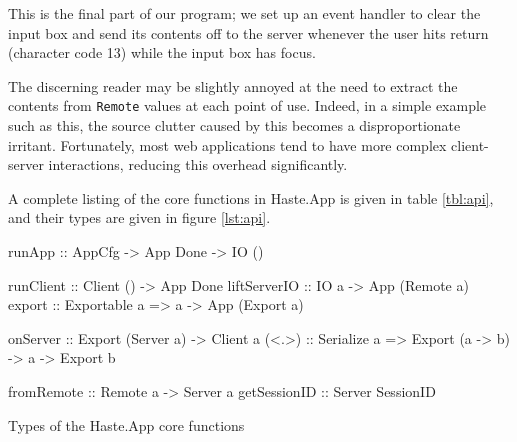 \documentclass[preprint]{sigplanconf}
\begin{document}

This is the final part of our program; we set up an event handler to clear the
input box and send its contents off to the server whenever the user hits return
(character code 13) while the input box has focus.

The discerning reader may be slightly annoyed at the need to extract the
contents from \lstinline!Remote! values at each point of use. Indeed, in a
simple example such as this, the source clutter caused by this becomes a
disproportionate irritant. Fortunately, most web applications tend to have
more complex client-server interactions, reducing this overhead significantly.

A complete listing of the core functions in Haste.App is given in table
\ref{tbl:api}, and their types are given in figure \ref{lst:api}.

\begin{listingfloat}
\begin{code}
runApp       :: AppCfg -> App Done -> IO ()

runClient    :: Client () -> App Done
liftServerIO :: IO a -> App (Remote a)
export       :: Exportable a
             => a -> App (Export a)

onServer     :: Export (Server a) -> Client a
(<.>)        :: Serialize a
             => Export (a -> b) -> a -> Export b

fromRemote   :: Remote a -> Server a
getSessionID :: Server SessionID
\end{code}
\caption{Types of the Haste.App core functions}
\label{lst:api}
\end{listingfloat}
\end{document}
